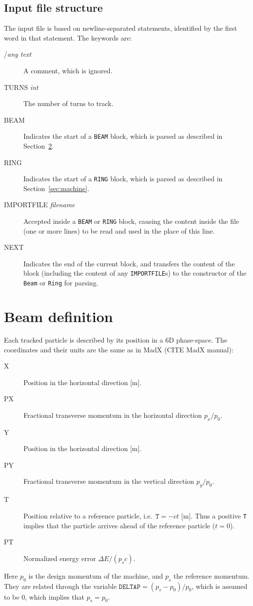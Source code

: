 \documentclass[a4paper]{report}
\begin{document}
\section{Input file structure}
The input file is based on newline-separated statements, identified by the first word in that statement.
The keywords are:
\begin{description}
\item[/\textit{any text}] A comment, which is ignored.
\item[TURNS \textit{int}] The number of turns to track.
\item[BEAM] Indicates the start of a \texttt{BEAM} block, which is parsed as described in Section~\ref{sec:beam}.
\item[RING] Indicates the start of a \texttt{RING} block, which is parsed as described in Section~\ref{sec:machine}.
\item[IMPORTFILE \textit{filename}] Accepted inside a \texttt{BEAM} or \texttt{RING} block, causing the content inside the file (one or more lines) to be read and used in the place of this line.
\item[NEXT] Indicates the end of the current block, and transfers the content of the block (including the content of any \texttt{IMPORTFILE}s) to the constructor of the \texttt{Beam} or \texttt{Ring} for parsing.
\end{description}

\chapter{Beam definition}
\label{sec:beam}


Each tracked particle is described by its position in a 6D phase-space.
The coordinates and their units are the same as in MadX (CITE MadX manual):
\begin{description}
\item[X]  Position in the horizontal direction [m].
\item[PX] Fractional transverse momentum in the horizontal direction $p_x/p_0$.
\item[Y]  Position in the horizontal direction [m].
\item[PY] Fractional transverse momentum in the vertical direction $p_y/p_0$.
\item[T]  Position relative to a reference particle, i.e.\ $\mathtt{T}=-c t$ [m]. Thus a positive \texttt{T} implies that the particle arrives ahead of the reference particle ($t=0$).
\item[PT] Normalized energy error $\Delta E/(p_s c)$.
\end{description}
Here $p_0$ is the design momentum of the machine, and $p_s$ the reference momentum.
They are related through the variable $\mathtt{DELTAP} = (p_s-p_0)/p_0$, which is assumed to be 0, which implies that $p_s = p_0$.
\end{document}
